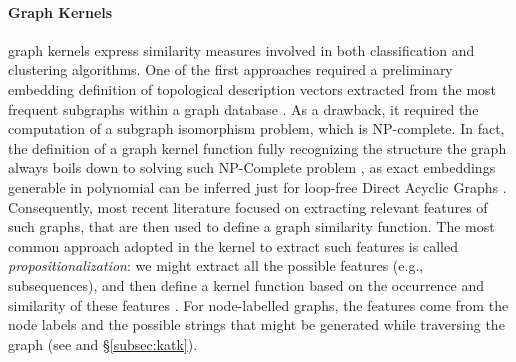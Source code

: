  
\paragraph*{Graph Kernels} graph kernels express similarity measures \cite{Samatova} involved in both classification \cite{TsudaS10} and clustering algorithms. One of the first approaches required a preliminary embedding definition of topological description vectors extracted from the most frequent subgraphs within a graph database \cite{Sidere}. As a drawback, it required the computation of a subgraph isomorphism problem, which is NP-complete. In fact, the definition of a graph kernel function fully recognizing the structure the graph always boils down to solving such NP-Complete problem \cite{GartnerFW03}, as exact embeddings generable in polynomial can be inferred just for loop-free Direct Acyclic Graphs \cite{BergamiBM20}. Consequently, most recent literature focused on extracting relevant features of such graphs, that are then used to define a graph similarity function. The most common approach adopted in the kernel to extract such features is called \textit{propositionalization}: we might extract all the possible features (e.g., subsequences), and then define a kernel function based on the occurrence and similarity of these features \cite{Gartner03}. For node-labelled graphs, the features come from the node labels and the possible strings that might be generated while traversing the graph (see \cite{Gartner03} and \S\ref{subsec:katk}). 